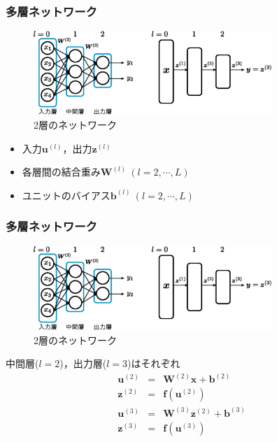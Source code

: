 \documentclass[dvipdfmx,11pt,notheorems]{beamer}
\theoremstyle{definition}
\begin{document}
\begin{frame}[fragile]\frametitle{多層ネットワーク}

\begin{figure}[tb]
  \begin{center}
    \includegraphics[clip,width=9cm]{fig/eps/unit.eps}
  \end{center}
  \caption{2層のネットワーク}
\end{figure}

\begin{itemize}
\item 入力$\bm{u}^{(l)}$，出力$\bm{z}^{(l)}$
\item 各層間の結合重み$\bm{W}^{(l)}\ (l=2,\cdots, L)$
\item ユニットのバイアス$\bm{b}^{(l)}\ (l=2,\cdots, L)$
\end{itemize}

\end{frame}

\begin{frame}[fragile]\frametitle{多層ネットワーク}

\begin{figure}[tb]
  \begin{center}
    \includegraphics[clip,width=9cm]{fig/eps/unit.eps}
  \end{center}
  \caption{2層のネットワーク}
\end{figure}
中間層($l=2$)，出力層($l=3$)はそれぞれ
\begin{eqnarray}
\label{eq:3a}
  \bm{u}^{(2)} &=& \bm{W}^{(2)}\bm{x} + \bm{b}^{(2)} \nonumber\\
  \bm{z}^{(2)} &=& \bm{f}(\bm{u}^{(2)}) \nonumber\\
  \bm{u}^{(3)} &=& \bm{W}^{(3)}\bm{z}^{(2)} + \bm{b}^{(3)} \nonumber\\
  \bm{z}^{(3)} &=& \bm{f}(\bm{u}^{(3)})\nonumber
\end{eqnarray}
\end{frame}
\end{document}
